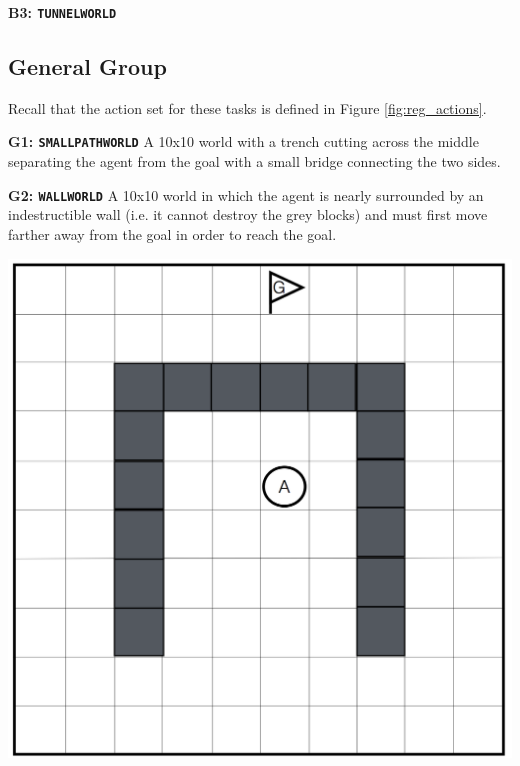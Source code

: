 \documentclass[]{article}
\begin{document}
{\bf B3: \texttt{TUNNELWORLD}}



\subsection{General Group}

Recall that the action set for these tasks is defined in Figure \ref{fig:reg_actions}.

{\bf G1: \texttt{SMALLPATHWORLD}} A 10x10 world with a trench cutting across the middle separating the agent from the goal with a small bridge connecting the two sides.


{\bf G2: \texttt{WALLWORLD}} A 10x10 world in which the agent is nearly surrounded by an indestructible wall (i.e. it cannot destroy the grey blocks) and must first move farther away from the goal in order to reach the goal.

\begin{center}
\includegraphics[scale=0.21]{figures/uwall.png}
\end{center}
\end{document}

